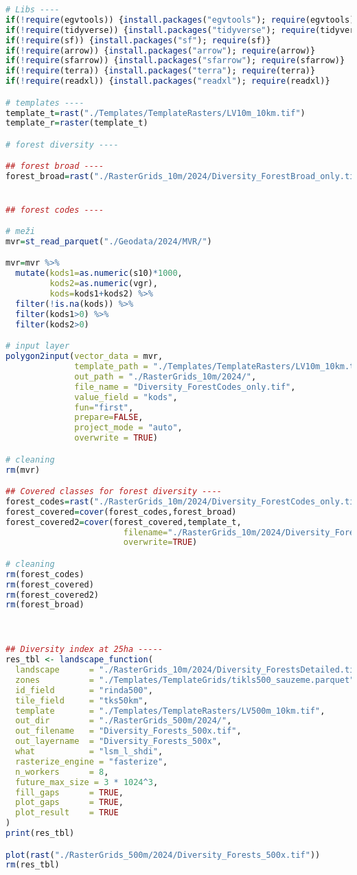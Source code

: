 \documentclass[
]{book}
\begin{document}
\begin{lstlisting}[language=R]
# Libs ----
if(!require(egvtools)) {install.packages("egvtools"); require(egvtools)}
if(!require(tidyverse)) {install.packages("tidyverse"); require(tidyverse)}
if(!require(sf)) {install.packages("sf"); require(sf)}
if(!require(arrow)) {install.packages("arrow"); require(arrow)}
if(!require(sfarrow)) {install.packages("sfarrow"); require(sfarrow)}
if(!require(terra)) {install.packages("terra"); require(terra)}
if(!require(readxl)) {install.packages("readxl"); require(readxl)}

# templates ----
template_t=rast("./Templates/TemplateRasters/LV10m_10km.tif")
template_r=raster(template_t)

# forest diversity ----

## forest broad ----
forest_broad=rast("./RasterGrids_10m/2024/Diversity_ForestBroad_only.tif")


## forest codes ----

# meži
mvr=st_read_parquet("./Geodata/2024/MVR/")

mvr=mvr %>% 
  mutate(kods1=as.numeric(s10)*1000,
         kods2=as.numeric(vgr),
         kods=kods1+kods2) %>% 
  filter(!is.na(kods)) %>% 
  filter(kods1>0) %>% 
  filter(kods2>0)

# input layer
polygon2input(vector_data = mvr,
              template_path = "./Templates/TemplateRasters/LV10m_10km.tif",
              out_path = "./RasterGrids_10m/2024/",
              file_name = "Diversity_ForestCodes_only.tif",
              value_field = "kods",
              fun="first",
              prepare=FALSE,
              project_mode = "auto",
              overwrite = TRUE)

# cleaning
rm(mvr)

## Covered classes for forest diversity ----
forest_codes=rast("./RasterGrids_10m/2024/Diversity_ForestCodes_only.tif")
forest_covered=cover(forest_codes,forest_broad)
forest_covered2=cover(forest_covered,template_t,
                        filename="./RasterGrids_10m/2024/Diversity_ForestsDetailed.tif",
                        overwrite=TRUE)

# cleaning
rm(forest_codes)
rm(forest_covered)
rm(forest_covered2)
rm(forest_broad)



## Diversity index at 25ha -----
res_tbl <- landscape_function(
  landscape      = "./RasterGrids_10m/2024/Diversity_ForestsDetailed.tif",
  zones          = "./Templates/TemplateGrids/tikls500_sauzeme.parquet",
  id_field       = "rinda500",
  tile_field     = "tks50km",
  template       = "./Templates/TemplateRasters/LV500m_10km.tif",
  out_dir        = "./RasterGrids_500m/2024/",
  out_filename   = "Diversity_Forests_500x.tif",
  out_layername  = "Diversity_Forests_500x",
  what           = "lsm_l_shdi",
  rasterize_engine = "fasterize",
  n_workers      = 8,
  future_max_size = 3 * 1024^3,
  fill_gaps      = TRUE,
  plot_gaps      = TRUE,
  plot_result    = TRUE
)
print(res_tbl)

plot(rast("./RasterGrids_500m/2024/Diversity_Forests_500x.tif"))
rm(res_tbl)
\end{lstlisting}
\end{document}
